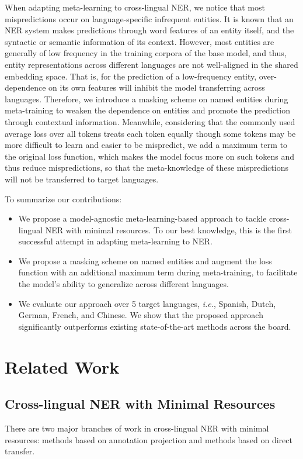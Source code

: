 \documentclass[letterpaper]{article} \usepackage{aaai20}  \usepackage{times}  \usepackage{helvet} \usepackage{courier}  \usepackage[hyphens]{url}  \usepackage{graphicx} \urlstyle{rm} \def\UrlFont{\rm}  \usepackage{graphicx}
\newcommand{\ie}{\textit{i.e.}}
\begin{document}
 When adapting meta-learning to cross-lingual NER, we notice that most mispredictions occur on language-specific infrequent entities. 
It is known that an NER system makes predictions through word features of an entity itself, and the syntactic or semantic information of its context.
However, most entities are generally of low frequency in the training corpora of the base model, and thus, entity representations across different languages are not well-aligned in the shared embedding space.
That is, for the prediction of a low-frequency entity, over-dependence on its own features will inhibit the model transferring across languages.
Therefore, we introduce a masking scheme on named entities during meta-training to weaken the dependence on entities and promote the prediction through contextual information.
Meanwhile, considering that the commonly used average loss over all tokens treats each token equally though some tokens may be more difficult to learn and easier to be mispredict, we add a maximum term to the original loss function, which makes the model focus more on such tokens and thus reduce mispredictions, so that the meta-knowledge of these mispredictions will not be transferred to target languages.

To summarize our contributions:
\begin{itemize}
\item We propose a model-agnostic meta-learning-based approach to tackle cross-lingual NER with minimal resources. To our best knowledge, this is the first successful attempt in adapting meta-learning to NER.
\item We propose a masking scheme on named entities and augment the loss function with an additional maximum term during meta-training, to facilitate the model's ability to generalize across different languages. 
\item We evaluate our approach over 5 target languages, \ie, Spanish, Dutch, German, French, and Chinese. We show that the proposed approach significantly outperforms existing state-of-the-art methods across the board.
\end{itemize}
 \section{Related Work}
\subsection{Cross-lingual NER with Minimal Resources}
There are two major branches of work in cross-lingual NER with minimal resources: methods based on annotation projection and methods based on direct transfer.
\end{document}
